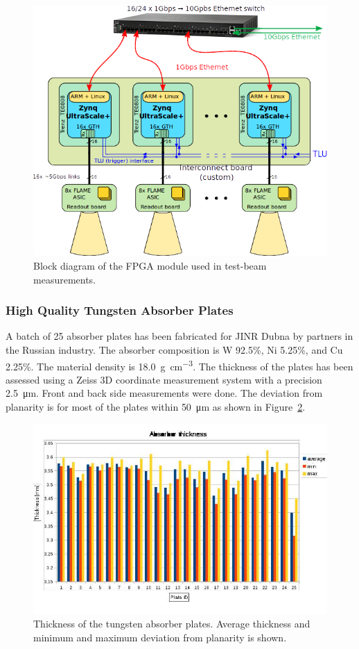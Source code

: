 \begin{figure}
\centering
    \includegraphics[width=\textwidth]{Calorimeter/FCAL/figs/FPGA_scheme} 
	\caption{Block diagram of the FPGA module used in test-beam measurements.}
    \label{fig:FPGA_scheme}
\end{figure}

\subsubsection{High Quality Tungsten Absorber Plates}

A batch of 25 absorber plates has been fabricated for JINR Dubna by partners in the Russian industry. 
The absorber composition is W 92.5\%, Ni 5.25\%, and Cu 2.25\%.
The material density is \SI{18.0}{\gram\per\centi\meter\cubed}. The thickness of the plates has been assessed using a Zeiss 3D coordinate
measurement system with a precision \SI{2.5}{\micro\meter}. Front and back side measurements were done. The deviation
from planarity is for most of the plates within \SI{50}{\micro\meter} as shown in Figure~\ref{fig:tungsten}.
\begin{figure}
  \centering
   \includegraphics[width=0.9\columnwidth]{Calorimeter/FCAL/figs/tungsten_disk_thickness.jpeg} 
   \caption{Thickness of the tungsten absorber plates. Average thickness and minimum and maximum deviation from planarity is shown.}
  \label{fig:tungsten}
\end{figure}

